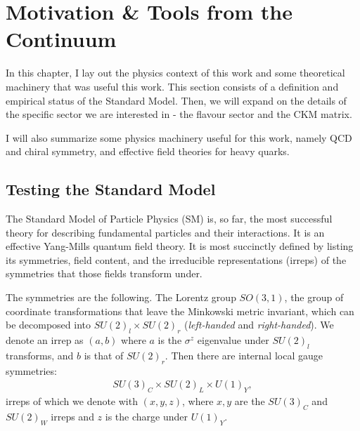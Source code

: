 \chapter{Motivation \& Tools from the Continuum}
\label{chap:background}

In this chapter, I lay out the physics context of this work and some theoretical machinery that was useful this work. This section consists of a definition and empirical status of the Standard Model. Then, we will expand on the details of the specific sector we are interested in - the flavour sector and the CKM matrix.

I will also summarize some physics machinery useful for this work, namely QCD and chiral symmetry, and effective field theories for heavy quarks.

\section{Testing the Standard Model}

The Standard Model of Particle Physics (SM) is, so far, the most successful theory for describing fundamental particles and their interactions. It is an effective Yang-Mills quantum field theory. It is most succinctly defined by listing its symmetries, field content, and the irreducible representations (irreps) of the symmetries that those fields transform under.

The symmetries are the following. The Lorentz group $SO(3,1)$, the group of coordinate transformations that leave the Minkowski metric invariant, which can be decomposed into $SU(2)_l\times SU(2)_r$ ({\it{left-handed}} and {\it{right-handed}}). We denote an irrep as $(a,b)$ where $a$ is the $\sigma^z$ eigenvalue under $SU(2)_l$ transforms, and $b$ is that of $SU(2)_r$. Then there are internal local gauge symmetries:
\begin{align}
  SU(3)_C\times SU(2)_L \times U(1)_Y,
\end{align}
irreps of which we denote with $(x,y,z)$, where $x,y$ are the $SU(3)_C$ and $SU(2)_W$ irreps and $z$ is the charge under $U(1)_Y$.

